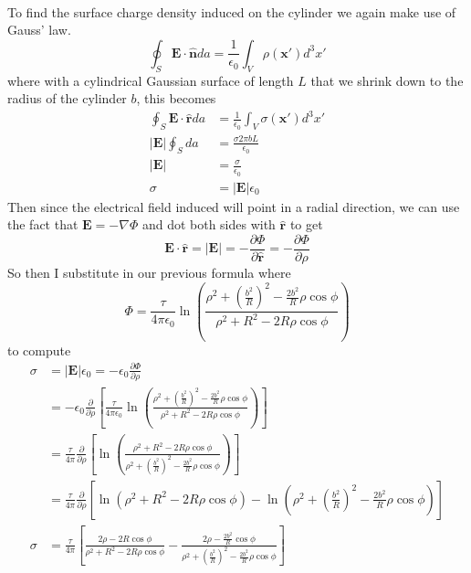 \documentclass{article}
\begin{document}
\paragraph{}
To find the surface charge density induced on the cylinder we again make use of Gauss' law.
\[ \oint_{S} \mathbf{E}\cdot\mathbf{\hat{n}} da = \frac{1}{\epsilon_{0}} \int_{V} \rho(\mathbf{x'}) d^{3}x' \]
where with a cylindrical Gaussian surface of length $L$ that we shrink down to the radius of the cylinder $b$, this becomes
\begin{align*}
\oint_{S} \mathbf{E}\cdot\mathbf{\hat{r}} da &= \frac{1}{\epsilon_{0}} \int_{V} \sigma(\mathbf{x'}) d^{3}x'\\
\left|  \mathbf{E} \right|\oint_{S}da &= \frac{\sigma 2\pi bL}{\epsilon_{0}}\\
\left|  \mathbf{E} \right| &= \frac{\sigma}{\epsilon_{0}}\\
\sigma &= \left|  \mathbf{E} \right| \epsilon_{0}
\end{align*}
Then since the electrical field induced will point in a radial direction, we can use the fact that $\mathbf{E}=-\nabla\Phi$ and dot both sides with $\mathbf{\hat{r}}$ to get
\[ \mathbf{E}\cdot\mathbf{\hat{r}} = \left|  \mathbf{E} \right| = -\frac{\partial\Phi}{\partial\mathbf{\hat{r}}} = -\frac{\partial\Phi}{\partial\rho} \]
So then I substitute in our previous formula where
\[ \Phi = \boxed{\frac{\tau}{4\pi\epsilon_{0}}\ln\left(\frac{\rho^{2} + (\frac{b^{2}}{R})^{2} - \frac{2b^{2}}{R}\rho\cos\phi}{\rho^{2} + R^{2} - 2R\rho\cos\phi}\right)} \]
to compute
\begin{align*}
\sigma &= \left|  \mathbf{E} \right| \epsilon_{0} = -\epsilon_{0}\frac{\partial\Phi}{\partial\rho}\\
&= -\epsilon_{0} \frac{\partial}{\partial\rho} \left[ \frac{\tau}{4\pi\epsilon_{0}}\ln\left(\frac{\rho^{2} + (\frac{b^{2}}{R})^{2} - \frac{2b^{2}}{R}\rho\cos\phi}{\rho^{2} + R^{2} - 2R\rho\cos\phi}\right) \right]\\
&= \frac{\tau}{4\pi} \frac{\partial}{\partial\rho} \left[\ln\left(\frac{\rho^{2} + R^{2} - 2R\rho\cos\phi}{\rho^{2} + (\frac{b^{2}}{R})^{2} - \frac{2b^{2}}{R}\rho\cos\phi}\right) \right]\\
&= \frac{\tau}{4\pi} \frac{\partial}{\partial\rho} \left[\ln\left(\rho^{2} + R^{2} - 2R\rho\cos\phi\right) - \ln\left( \rho^{2} + \left(\frac{b^{2}}{R}\right)^{2} - \frac{2b^{2}}{R}\rho\cos\phi \right)\right]\\
\sigma &= \frac{\tau}{4\pi} \left[ \frac{ 2\rho - 2R\cos\phi }{\rho^{2} + R^{2} - 2R\rho\cos\phi} - \frac{2\rho - \frac{2b^{2}}{R}\cos\phi}{\rho^{2} + \left(\frac{b^{2}}{R}\right)^{2} - \frac{2b^{2}}{R}\rho\cos\phi} \right]\\
\end{align*}
\end{document}
